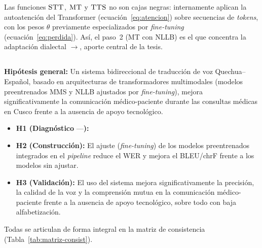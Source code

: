 \begin{bloqueNuevo}
\noindent Las funciones $\textsc{STT}$, $\textsc{MT}$ y $\textsc{TTS}$ no son cajas negras: internamente
aplican la autoatenci{\'o}n del Transformer (ecuaci{\'o}n~\ref{eq:atencion}) sobre secuencias de
\emph{tokens}, con los pesos $\theta$ previamente especializados por \emph{fine-tuning}
(ecuaci{\'o}n~\ref{eq:perdida}). As{\'i}, el paso~2 (MT con NLLB) es el que concentra la
adaptaci{\'o}n dialectal $\to$, aporte central de la tesis.
\end{bloqueNuevo}

\subsection{}
\begin{bloqueObsDos}
\noindent\textbf{Hip{\'o}tesis general:} Un sistema bidireccional de traducci{\'o}n de voz
Quechua--Espa{\~n}ol, basado en arquitecturas de transformadores multimodales (modelos preentrenados
MMS y NLLB ajustados por \emph{fine-tuning}), mejora significativamente la comunicaci{\'o}n m{\'e}dico-paciente durante las consultas
m{\'e}dicas en Cusco frente a la ausencia de apoyo tecnol{\'o}gico.
\begin{itemize}
  \item \textbf{H1 (Diagn{\'o}stico} ---\textbf{):} 
  \item \textbf{H2 (Construcci{\'o}n):} El ajuste (\emph{fine-tuning}) de los modelos preentrenados integrados en el \emph{pipeline} reduce el WER y mejora el BLEU/chrF frente a los modelos sin ajustar.
  \item \textbf{H3 (Validaci{\'o}n):} El uso del sistema mejora significativamente la precisi{\'o}n, la calidad de la voz y la comprensi{\'o}n mutua en la comunicaci{\'o}n m{\'e}dico-paciente frente a la ausencia de apoyo tecnol{\'o}gico, sobre todo con baja alfabetizaci{\'o}n.
\end{itemize}
\noindent {} Todas se articulan de forma integral en la
matriz de consistencia (Tabla~\ref{tab:matriz-consist}).
\end{bloqueObsDos}

